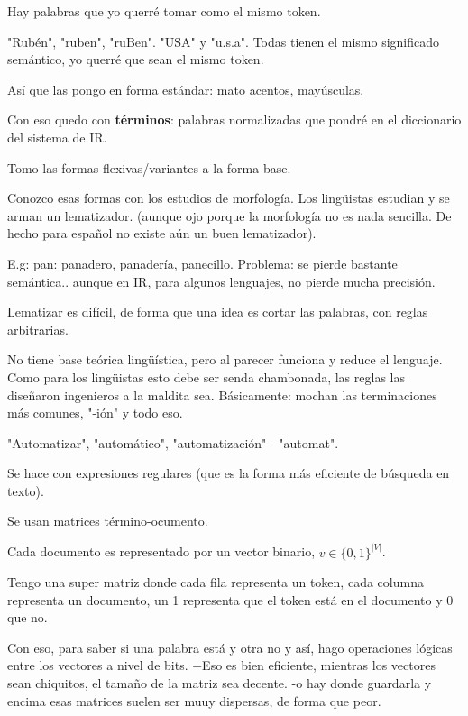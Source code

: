 \documentclass{fmbnotes}
\begin{document}
Hay palabras que yo querré tomar como el mismo token.

"Rubén", "ruben", "ruBen". "USA" y "u.s.a". Todas tienen el mismo significado semántico, yo querré que sean el mismo token.

Así que las pongo en forma estándar: mato acentos, mayúsculas.

Con eso quedo con \textbf{términos}: palabras normalizadas que pondré en el diccionario del sistema de IR.


\label{sec:3_lematizacion}

Tomo las formas flexivas/variantes a la forma base.

Conozco esas formas con los estudios de morfología. Los lingüistas estudian y se arman un lematizador. (aunque ojo porque la morfología no es nada sencilla. De hecho para español no existe aún un buen lematizador).

E.g:
pan: panadero, panadería, panecillo.
Problema: se pierde bastante semántica.. aunque en IR, para algunos lenguajes, no pierde mucha precisión.

\label{sec:3_alternativo_stemming}

Lematizar es difícil, de forma que una idea es cortar las palabras, con reglas arbitrarias.

No tiene base teórica lingüística, pero al parecer funciona y reduce el lenguaje.
Como para los lingüistas esto debe ser senda chambonada, las reglas las diseñaron ingenieros a la maldita sea.
Básicamente: mochan las terminaciones más comunes, "-ión" y todo eso. 

"Automatizar", "automático", "automatización" - "automat".

Se hace con expresiones regulares (que es la forma más eficiente de búsqueda en texto).


\label{sec:representacion}

Se usan matrices término-ocumento.

\label{sec:matriz_termino_ocumento_binaria}
Cada documento es representado por un vector binario, \(v \in \{0,1\}^{|V|}\).

Tengo una super matriz donde cada fila representa un token, cada columna representa un documento, un 1 representa que el token está en el documento y 0 que no.

Con eso, para saber si una palabra está y otra no y así, hago operaciones lógicas entre los vectores a nivel de bits.
+Eso es bien eficiente, mientras los vectores sean chiquitos, el tamaño de la matriz sea decente.
-o hay donde guardarla y encima esas matrices suelen ser muuy dispersas, de forma que peor.
\end{document}
